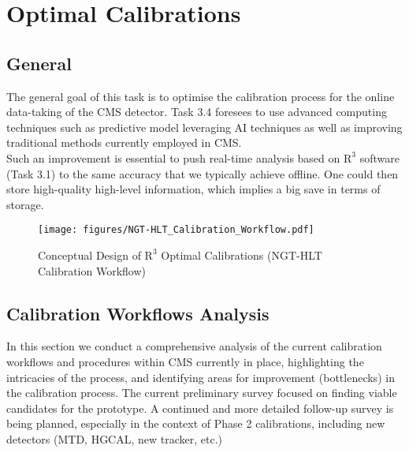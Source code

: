 \chapter{Optimal Calibrations}
\section{General} %

The general goal of this task is to optimise the calibration process for the online data-taking of the CMS detector. Task 3.4 foresees to use advanced computing techniques such as predictive model leveraging AI techniques as well as improving traditional methods currently employed in CMS.\\
Such an improvement is essential to push real-time analysis based on $\mathrm{R}^3$ software (Task 3.1) to the same accuracy that we typically achieve offline. One could then store high-quality high-level information, which implies a big save in terms of storage.


\begin{figure}[h!]	
\centering
\texttt{[image: figures/NGT-HLT\_Calibration\_Workflow.pdf]} %
\caption{Conceptual Design of $\mathrm{R}^{3}$ Optimal Calibrations (NGT-HLT Calibration Workflow)}
\label{fig:NGT-HLT_CalibrationWorkflow}
\end{figure}

\section{Calibration Workflows Analysis}
In this section we conduct a comprehensive analysis of the current calibration workflows and procedures within CMS currently in place, highlighting the intricacies of the process, and identifying areas for improvement (bottlenecks) in the calibration process. 
The current preliminary survey focused on finding viable candidates for the prototype. A continued and more detailed follow-up survey is being planned, especially in the context of Phase 2 calibrations, including new detectors (MTD, HGCAL, new tracker, etc.)

